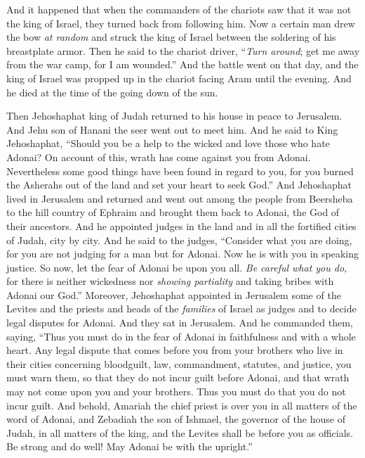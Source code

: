 \begin{biblechapter}
\verse And it happened that when the commanders of the chariots saw that it was not the king of Israel, they turned back from following him.
\verse Now a certain man drew the bow \textit{at random} and struck the king of Israel between the soldering of his breastplate armor. Then he said to the chariot driver, “\textit{Turn around}; get me away from the war camp, for I am wounded.”
\verse And the battle went on that day, and the king of Israel was propped up in the chariot facing Aram until the evening. And he died at the time of the going down of the sun.
\end{biblechapter}

\begin{biblechapter} %
 Then Jehoshaphat king of Judah returned to his house in peace to Jerusalem.
\verse And Jehu son of Hanani the seer went out to meet him. And he said to King Jehoshaphat, “Should you be a help to the wicked and love those who hate Adonai? On account of this, wrath has come against you from Adonai.
\verse Nevertheless some good things have been found in regard to you, for you burned the Asherahs out of the land and set your heart to seek God.”
\verse And Jehoshaphat lived in Jerusalem and returned and went out among the people from Beersheba to the hill country of Ephraim and brought them back to Adonai, the God of their ancestors.
\verse And he appointed judges in the land and in all the fortified cities of Judah, city by city.
\verse And he said to the judges, “Consider what you are doing, for you are not judging for a man but for Adonai. Now he is with you in speaking justice.
\verse So now, let the fear of Adonai be upon you all. \textit{Be careful what you do}, for there is neither wickedness nor \textit{showing partiality} and taking bribes with Adonai our God.”
\verse Moreover, Jehoshaphat appointed in Jerusalem some of the Levites and the priests and heads of the \textit{families} of Israel as judges and to decide legal disputes for Adonai. And they sat in Jerusalem.
\verse And he commanded them, saying, “Thus you must do in the fear of Adonai in faithfulness and with a whole heart.
\verse Any legal dispute that comes before you from your brothers who live in their cities concerning bloodguilt, law, commandment, statutes, and justice, you must warn them, so that they do not incur guilt before Adonai, and that wrath may not come upon you and your brothers. Thus you must do that you do not incur guilt.
\verse And behold, Amariah the chief priest is over you in all matters of the word of Adonai, and Zebadiah the son of Ishmael, the governor of the house of Judah, in all matters of the king, and the Levites shall be before you as officials. Be strong and do well! May Adonai be with the upright.”
\end{biblechapter}

